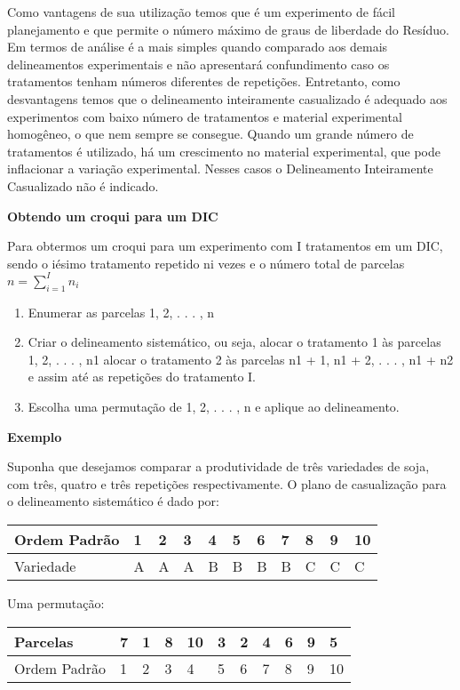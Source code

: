 \documentclass[
]{book}
\providecommand{\tightlist}{%
  \setlength{\itemsep}{0pt}\setlength{\parskip}{0pt}}
\begin{document}
Como vantagens de sua utilização temos que é um experimento de fácil planejamento e que permite o número máximo de graus de liberdade do Resíduo. Em termos de análise é a mais simples quando comparado aos demais delineamentos experimentais e não apresentará confundimento caso os tratamentos tenham números diferentes de repetições. Entretanto, como desvantagens temos que o delineamento inteiramente casualizado é adequado aos experimentos com baixo número de tratamentos e material experimental homogêneo, o que nem sempre se consegue. Quando um grande número de tratamentos é utilizado, há um crescimento no material experimental, que pode inflacionar a variação experimental. Nesses casos o Delineamento Inteiramente Casualizado não é indicado.

\textbf{Obtendo um croqui para um DIC}

Para obtermos um croqui para um experimento com I tratamentos em um DIC, sendo o
iésimo tratamento repetido ni vezes e o número total de parcelas \(n=\sum_{i=1}^I n_i\)

\begin{enumerate}
\def\labelenumi{(\roman{enumi})}
\tightlist
\item
  Enumerar as parcelas 1, 2, . . . , n
\item
  Criar o delineamento sistemático, ou seja,
  alocar o tratamento 1 às parcelas 1, 2, . . . , n1
  alocar o tratamento 2 às parcelas n1 + 1, n1 + 2, . . . , n1 + n2
  e assim até as repetições do tratamento I.
\item
  Escolha uma permutação de 1, 2, . . . , n e aplique ao delineamento.
\end{enumerate}

\textbf{Exemplo}

Suponha que desejamos comparar a produtividade de três variedades de soja, com três, quatro e três repetições respectivamente. O plano de casualização para o delineamento sistemático é dado por:

\begin{longtable}[]{@{}lllllllllll@{}}
\toprule()
Ordem Padrão & 1 & 2 & 3 & 4 & 5 & 6 & 7 & 8 & 9 & 10 \\
\midrule()
\endhead
Variedade & A & A & A & B & B & B & B & C & C & C \\
\bottomrule()
\end{longtable}

Uma permutação:

\begin{longtable}[]{@{}lllllllllll@{}}
\toprule()
Parcelas & 7 & 1 & 8 & 10 & 3 & 2 & 4 & 6 & 9 & 5 \\
\midrule()
\endhead
Ordem Padrão & 1 & 2 & 3 & 4 & 5 & 6 & 7 & 8 & 9 & 10 \\
\bottomrule()
\end{longtable}
\end{document}
